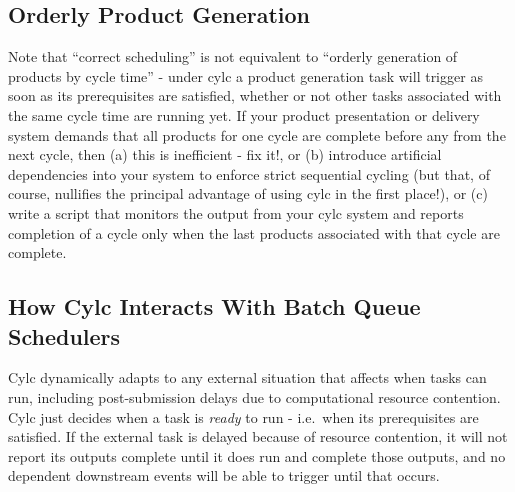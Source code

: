 \documentclass[11pt,a4paper]{article}
\begin{document}

\subsection{Orderly Product Generation}
\label{OrderlyProductGeneration}

Note that ``correct scheduling'' is not equivalent to ``orderly
generation of products by cycle time'' - under cylc a product
generation task will trigger as soon as its prerequisites are satisfied,
whether or not other tasks associated with the same cycle time are
running yet. If your product presentation or delivery system demands
that all products for one cycle are complete before any from the next
cycle, then (a) this is inefficient - fix it!, or (b) introduce artificial
dependencies into your system to enforce strict sequential cycling (but
that, of course, nullifies the principal advantage of using cylc in the
first place!), or (c) write a script that monitors the output from 
your cylc system and reports completion of a cycle only when the last
products associated with that cycle are complete. 

%


\subsection{How Cylc Interacts With Batch Queue Schedulers}
\label{HowCylcInteractsWithBatchQueueSchedulers}

Cylc dynamically adapts to any external situation that affects when tasks 
can run, including post-submission delays due to computational resource
contention. Cylc just decides when a task is {\em ready} to run - i.e.\ when
its prerequisites are satisfied.  If the external task is delayed
because of resource contention, it will not report its outputs complete
until it does run and complete those outputs, and no dependent
downstream events will be able to trigger until that occurs.
\end{document}
